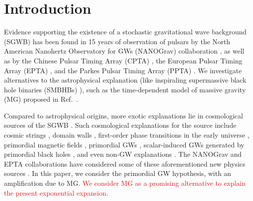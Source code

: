 \documentclass[prd,twocolumn,aps,psfig,nofootinbib,nobibnotes,superscriptaddress,preprintnumbers,times]{revtex4-2}
\def\red{\textcolor{red}}
\begin{document}
\section{Introduction}
Evidence supporting the existence of a stochastic gravitational wave background (SGWB) has been found in 15 years of observation of pulsars by the North American Nanohertz Observatory for GWs (NANOGrav) collaboration \cite{Agazie:2023}, as well as by the Chinese Pulsar Timing Array (CPTA) \cite{Xu:2023wog}, the European Pulsar Timing Array (EPTA) \cite{EPTA:2023sfo, EPTA:2023akd, EPTA:2023fyk}, and the Parkes Pulsar Timing Array (PPTA) \cite{Zic:2023gta,Reardon:2023gzh}. We investigate alternatives to the astrophysical explanation (like inspiraling supermassive black hole binaries (SMBHBs) \cite{Rajagopal:1995,Jaffe:2002rt,Burke-Spolaor:2018bvk}), such as the time-dependent model of massive gravity (MG) proposed in Ref.\ \cite{Fujita:2018ehq}. 

Compared to astrophysical origins, more exotic explanations lie in cosmological sources of the SGWB  \cite{Maggiore:1999vm, Caprini:2018mtu, Chen:2021wdo, Wu:2021kmd, Chen:2021ncc, PPTA:2022eul, Wu:2023pbt, Wu:2023dnp, Madge:2023cak, Ellis:2023oxs}. Such cosmological explanations for the source include  cosmic strings \cite{Damour:2004kw,Siemens:2006yp, Chen:2022azo,Bian:2022tju}, domain walls \cite{Ferreira:2022zzo, Zhang:2023nrs}, first-order phase transitions in the early universe \cite{Kibble:1976sj, Vilenkin:1984ib,Caprini:2010xv, Kobakhidze:2017mru, Arunasalam:2017ajm, Xue:2021gyq, NANOGrav:2021flc, Moore:2021ibq, Addazi:2023jvg, Athron:2023xlk, Bringmann:2023opz, Ashoorioon:2022raz}, primordial magnetic fields \cite{Neronov:2020qrl,Brandenburg:2021tmp,RoperPol:2022iel,Kahniashvili:2021gym}, primordial GWs \cite{Grishchuk:1976, Grishchuk:1977zz, Starobinsky:1980te, Linde:1981mu, Fabbri:1983us, Grishchuk:2005qe, Lasky:2015lej, Kawai:2023nqs, Basilakos:2023xof, Basilakos:2023jvp}, scalar-induced GWs \cite{Tomita:1967non, Saito:2008jc, Young:2014ana, Yuan:2019udt, Yuan:2019wwo, Chen:2019xse, Cai:2019bmk, Yuan:2019fwv, Liu:2021jnw, Liu:2023ymk, Cai:2023dls, Choudhury:2023fjs, Choudhury:2023fwk, Bhattacharya:2023ysp, Choudhury:2023hfm, Kawai:2021edk} generated by primordial black holes \cite{Zeldovich:1967lct,Hawking:1971ei,Carr:1974nx,Chen:2018czv,Chen:2018rzo,Liu:2018ess,Liu:2019rnx,Chen:2019irf,Liu:2020cds,Wu:2020drm,Chen:2021nxo,Chen:2022fda,Chen:2022qvg,Liu:2022iuf,Zheng:2022wqo, Choudhury:2013woa, Franciolini:2023pbf}, and even non-GW explanations \cite{Chowdhury:2023xvy}. The NANOGrav and EPTA collaborations have considered some of these aforementioned new physics sources \cite{Afzal:2023,EPTA:2023xxk}.
In this paper, we consider the primordial GW hypothesis, with an amplification due to MG. \red{We consider MG as a promising alternative to explain the present exponential expansion. }
\end{document}
